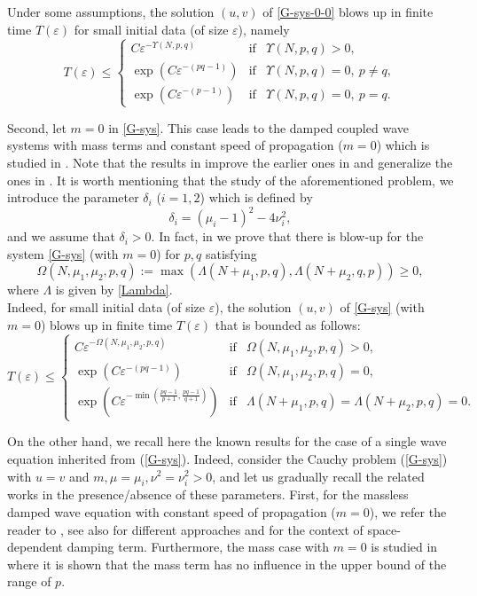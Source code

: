 \documentclass[12pt,leqno]{amsart}
\numberwithin{equation}{section}
\theoremstyle{remark}
\newcommand{\de}{\delta}
\def\e{{\varepsilon}}
\begin{document}
Under some assumptions, the solution $(u,v)$ of \eqref{G-sys-0-0} blows up in finite time $T(\e)$ for small initial data (of size $\e$),  namely 
\begin{equation}\label{Teps}
T(\e) \le \left\{
\begin{array}{lll}
C \e^{-\Upsilon(N,p,q)}& \text{if}&\Upsilon(N,p,q)>0,\\
\exp(C \e^{-(pq-1)})& \text{if}&\Upsilon(N,p,q)=0, \ p \neq q,\\
\exp(C \e^{-(p-1)})& \text{if}&\Upsilon(N,p,q)=0, \ p = q.
\end{array}
\right.
\end{equation}

Second, let $m= 0$ in \eqref{G-sys}. This case  leads to the damped coupled wave systems with mass terms and constant speed of propagation ($m=0$) which is studied in \cite{Our9}. Note that the results in \cite{Our9} improve the earlier ones in \cite{Palmieri} and generalize the ones in \cite{Our4}. It is worth mentioning that the study of the aforementioned problem,  we introduce the parameter $\de_i$ ($i=1,2$) which is defined by
\begin{equation}\label{delta}
\de_i=(\mu_i-1)^2-4\nu_i^2,
\end{equation}
and we assume that $\de_i >0$. In  fact,  in \cite{Our9} we prove that there is blow-up for the system  \eqref{G-sys} (with $m=0$) for $p,q$  satisfying
\begin{equation}\label{blow-up-reg}
\Omega(N,\mu_1,\mu_2,p,q):=\max (\Lambda(N+\mu_1,p,q), \Lambda(N+\mu_2,q,p)) \ge 0,
\end{equation}
where $\Lambda$ is given by \eqref{Lambda}.\\
Indeed, for small initial data (of size $\e$), the solution $(u,v)$ of \eqref{G-sys} (with $m=0$) blows up in finite time $T(\e)$ that is bounded as follows:
\begin{equation}\label{Teps}
T(\e) \le \left\{
\begin{array}{lll}
C \e^{-\Omega(N,\mu_1,\mu_2,p,q)}& \text{if}&\Omega(N,\mu_1,\mu_2,p,q)>0,\\
\exp(C \e^{-(pq-1)})& \text{if}&\Omega(N,\mu_1,\mu_2,p,q)=0, \\
\exp(C \e^{-\min \left(\frac{pq-1}{p+1},\frac{pq-1}{q+1}\right)})& \text{if}&\Lambda(N+\mu_1,p,q)=\Lambda(N+\mu_2,p,q)=0.
\end{array}
\right.
\end{equation}

On the other hand, we recall here the known results for the case of a single wave equation inherited from (\ref{G-sys}). Indeed,  consider the Cauchy problem (\ref{G-sys}) with $u=v$ and $m,\mu=\mu_i, \nu^2=\nu_i^2>0$, and let us gradually recall the related works in the presence/absence of these parameters. First, for the massless damped wave equation with constant speed of propagation ($m=0$), we refer the reader to \cite{Our, Our2}, see also \cite{Chen,Palmieri-Tu-2019} for different approaches and \cite{Fino} for the context of space-dependent damping term. Furthermore, the mass case with $m=0$ is studied in \cite{Our3} where it is shown that the mass term has no influence in the upper bound of the range of $p$. \\
\end{document}

